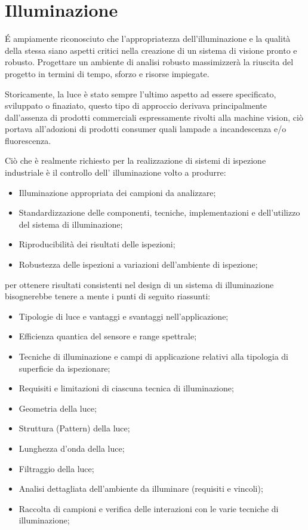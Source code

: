 \section{Illuminazione}
\'{E} ampiamente riconosciuto che l'appropriatezza dell'illuminazione e la qualità della stessa
siano aspetti critici nella creazione di un sistema di visione pronto e robusto.
Progettare un ambiente di analisi robusto massimizzerà la riuscita del progetto in termini
di tempo, sforzo e risorse impiegate.

Storicamente, la luce è stato sempre l'ultimo aspetto ad essere specificato, sviluppato o finaziato, questo tipo di approccio derivava principalmente dall'assenza di prodotti commerciali espressamente rivolti alla machine vision, ciò portava all'adozioni di prodotti consumer quali lampade a incandescenza e/o fluorescenza.

Ciò che è realmente richiesto per la realizzazione di sistemi di ispezione industriale è il controllo dell' illuminazione volto a produrre:

\begin{itemize}
	\item Illuminazione appropriata dei campioni da analizzare;
	\item Standardizzazione delle componenti, tecniche, implementazioni e dell'utilizzo del sistema di illuminazione;
	\item Riproducibilità dei risultati delle ispezioni;
	\item Robustezza delle ispezioni a variazioni dell'ambiente di ispezione;
\end{itemize} 

per ottenere risultati consistenti nel design di un sistema di illuminazione bisognerebbe tenere a mente i punti di seguito riassunti:

\begin{itemize}
	\item Tipologie di luce e vantaggi e svantaggi nell'applicazione;
	\item Efficienza quantica del sensore e range spettrale;
	\item Tecniche di illuminazione e campi di applicazione relativi alla tipologia di superficie da ispezionare;
	\item Requisiti e limitazioni di ciascuna tecnica di illuminazione;
	\item Geometria della luce;
	\item Struttura (Pattern) della luce;
	\item Lunghezza d'onda della luce;
	\item Filtraggio della luce;
	\item Analisi dettagliata dell'ambiente da illuminare (requisiti e vincoli);
	\item Raccolta di campioni e verifica delle interazioni con le varie tecniche di illuminazione;
\end{itemize}

